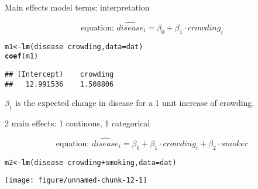 \documentclass[table]{beamer}\usepackage[]{graphicx}\usepackage[]{color}
\makeatletter
\def\maxwidth{ %
  \ifdim\Gin@nat@width>\linewidth
    \linewidth
  \else
    \Gin@nat@width
  \fi
}
\newcommand{\hlopt}[1]{\textcolor[rgb]{0,0,0}{#1}}%
\newcommand{\hlstd}[1]{\textcolor[rgb]{0.345,0.345,0.345}{#1}}%
\newcommand{\hlkwb}[1]{\textcolor[rgb]{0.69,0.353,0.396}{#1}}%
\newcommand{\hlkwc}[1]{\textcolor[rgb]{0.333,0.667,0.333}{#1}}%
\newcommand{\hlkwd}[1]{\textcolor[rgb]{0.737,0.353,0.396}{\textbf{#1}}}%
\newenvironment{kframe}{%
 \def\at@end@of@kframe{}%
 \ifinner\ifhmode%
  \def\at@end@of@kframe{\end{minipage}}%
  \begin{minipage}{\columnwidth}%
 \fi\fi%
 \def\FrameCommand##1{\hskip\@totalleftmargin \hskip-\fboxsep
 \colorbox{shadecolor}{##1}\hskip-\fboxsep
     \hskip-\linewidth \hskip-\@totalleftmargin \hskip\columnwidth}%
 \MakeFramed {\advance\hsize-\width
   \@totalleftmargin\z@ \linewidth\hsize
   \@setminipage}}%
 {\par\unskip\endMakeFramed%
 \at@end@of@kframe}
\newenvironment{knitrout}{}{} %
\makeatother
\begin{document}


\begin{frame}[fragile]{Main effects model terms: interpretation}

$$ \mbox{equation: \ }  \widehat{disease}_i = \beta_0 + \beta_1\cdot crowding_i $$

\begin{knitrout}\scriptsize
{}\color{fgcolor}\begin{kframe}
\begin{alltt}
\hlstd{m1} \hlkwb{<-} \hlkwd{lm}\hlstd{(disease} \hlopt{~} \hlstd{crowding,} \hlkwc{data}\hlstd{=dat)}
\hlkwd{coef}\hlstd{(m1)}
\end{alltt}
\begin{verbatim}
## (Intercept)    crowding 
##   12.991536    1.508806
\end{verbatim}
\end{kframe}
\end{knitrout}

$\beta_1$ is the expected change in disease for a 1 unit increase of crowding.


\end{frame}



\begin{frame}[fragile]{2 main effects: 1 continous, 1 categorical}

$$ \mbox{equation: \ }  \widehat{disease}_i = \beta_0 + \beta_1\cdot crowding_i + \beta_2 \cdot smoker $$

\begin{knitrout}\scriptsize
{}\color{fgcolor}\begin{kframe}
\begin{alltt}
\hlstd{m2} \hlkwb{<-} \hlkwd{lm}\hlstd{(disease} \hlopt{~} \hlstd{crowding} \hlopt{+} \hlstd{smoking,} \hlkwc{data}\hlstd{=dat)}
\end{alltt}
\end{kframe}
\end{knitrout}


\begin{knitrout}\scriptsize
{}\color{fgcolor}
\texttt{[image: figure/unnamed-chunk-12-1]} 
\end{knitrout}

\end{frame}
\end{document}
